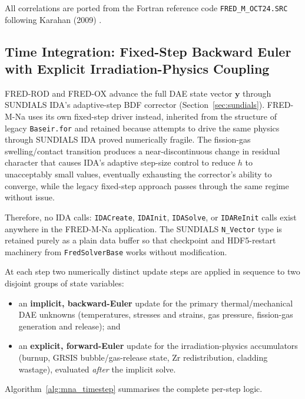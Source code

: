 \begin{refsection}
All correlations are ported from the Fortran reference code \texttt{FRED\_M\_OCT24.SRC} \cite{timpanoFredM} following Karahan (2009) \cite{karahan2009}.

\subsection{Time Integration: Fixed-Step Backward Euler with Explicit Irradiation-Physics Coupling}
\label{sec:mna_time_integration}

FRED-ROD and FRED-OX advance the full DAE state vector $\mathbf{y}$ through SUNDIALS IDA's adaptive-step BDF corrector (Section~\ref{sec:sundials}). FRED-M-Na uses its own fixed-step driver instead, inherited from the structure of legacy \texttt{Baseir.for} and retained because attempts to drive the same physics through SUNDIALS IDA proved numerically fragile. The fission-gas swelling/contact transition produces a near-discontinuous change in residual character that causes IDA's adaptive step-size control to reduce $h$ to unacceptably small values, eventually exhausting the corrector's ability to converge, while the legacy fixed-step approach passes through the same regime without issue.  

Therefore, no IDA calls: \texttt{IDACreate}, \texttt{IDAInit}, \texttt{IDASolve}, or \texttt{IDAReInit} calls exist anywhere in the FRED-M-Na application. The SUNDIALS \texttt{N\_Vector} type is retained purely as a plain data buffer so that checkpoint and HDF5-restart machinery from \texttt{FredSolverBase} works without modification.

At each step two numerically distinct update steps are applied in sequence to two disjoint groups of state variables:
\begin{itemize}
\item an \textbf{implicit, backward-Euler} update for the primary thermal/mechanical DAE unknowns (temperatures, stresses and strains, gas pressure, fission-gas generation and release); and
\item an \textbf{explicit, forward-Euler} update for the irradiation-physics accumulators (burnup, GRSIS bubble/gas-release state, Zr redistribution, cladding wastage), evaluated \emph{after} the implicit solve.
\end{itemize}

Algorithm~\ref{alg:mna_timestep} summarises the complete per-step logic.


\end{refsection}
